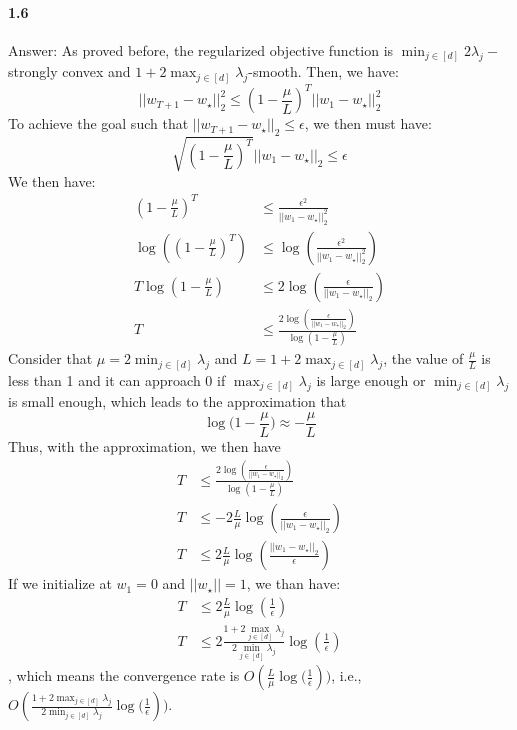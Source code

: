 \documentclass[11pt]{article}
\begin{document}
\paragraph{1.6}
Answer:
\newline
As proved before, the regularized objective function is $\min_{j\in [d]} 2\lambda_j-$strongly convex and $1+2\max_{j\in [d]}{\lambda_j}$-smooth. Then, we have:
\begin{equation}
    ||w_{T+1}-w_\star||_2^2 \leq (1-\frac{\mu}{L})^T||w_1-w_\star||^2_2
\end{equation}
To achieve the goal such that $||w_{T+1}-w_\star||_2 \leq \epsilon$, we then must have:
\begin{equation}
    \sqrt{(1-\frac{\mu}{L})^T}||w_1-w_\star||_2 \leq \epsilon
\end{equation}
We then have:
\begin{equation}
    \begin{split}
        (1-\frac{\mu}{L})^T &\leq \frac{\epsilon^2}{||w_1-w_\star||_2^2}\\
        \log{((1-\frac{\mu}{L})^T)} &\leq \log{(\frac{\epsilon^2}{||w_1-w_\star||_2^2})}\\
        T\log{(1-\frac{\mu}{L})} &\leq 2\log{(
        \frac{\epsilon}{||w_1-w_\star||_2})} \\ 
        T &\leq \frac{2\log{(
        \frac{\epsilon}{||w_1-w_\star||_2})}}{\log{(1-\frac{\mu}{L})}}
    \end{split}
\end{equation}
Consider that $\mu=2\min_{j\in[d]}{\lambda_j}$ and $L=1+2\max_{j\in[d]}\lambda_j$, the value of $\frac{\mu}{L}$ is less than 1 and it can approach 0 if $\max_{j\in[d]}\lambda_j$ is large enough or $\min_{j\in[d]}\lambda_j$ is small enough, which leads to the approximation that
\begin{equation}
    \log{(1-\frac{\mu}{L}}) \approx -\frac{\mu}{L}
\end{equation}
Thus, with the approximation, we then have
\begin{equation}
    \begin{split}
        T &\leq \frac{2\log{(
        \frac{\epsilon}{||w_1-w_\star||_2})}}{\log{(1-\frac{\mu}{L})}} \\
        T &\leq -2\frac{L}{\mu}\log{(\frac{\epsilon}{||w_1-w_\star||_2})}\\
        T &\leq 2\frac{L}{\mu}\log{(\frac{||w_1-w_\star||_2}{\epsilon})}
    \end{split}
\end{equation}
If we initialize at $w_1=0$ and $||w_\star||=1$, we than have:
\begin{equation}
    \begin{split}
        T &\leq 2\frac{L}{\mu}\log{(\frac{1}{\epsilon})} \\ 
        T &\leq 2\frac{1+2\max_{j\in[d]}\lambda_j}{2\min_{j\in[d]}{\lambda_j}}\log{(\frac{1}{\epsilon})}
    \end{split}
\end{equation}
, which means the convergence rate is $O(\frac{L}{\mu}\log{(\frac{1}{\epsilon}}))$, i.e., $O(\frac{1+2\max_{j\in[d]}\lambda_j}{2\min_{j\in[d]}\lambda_j}\log{(\frac{1}{\epsilon}}))$.
\end{document}
